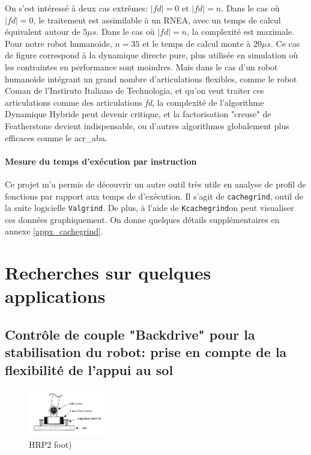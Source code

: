 \documentclass{report}
\begin{document}
On s'est intéressé à deux cas extrêmes: $|fd|=0$ et $|fd|=n$. Dans le cas où $|fd|=0$, le traitement est assimilable à un RNEA, avec un temps de calcul équivalent autour de $5\mu s$. Dans le cas où $|fd|=n$, la complexité est maximale. Pour notre robot humanoïde, $n=35$ et le temps de calcul monte à $20\mu s$. Ce cas de figure correspond à la dynamique directe pure, plus utilisée en simulation où les contraintes en performance sont moindres. Mais dans le cas d'un robot humanoïde intégrant un grand nombre d'articulations flexibles, comme le robot Coman de l'Instiruto Italiano de Technologia, et qu'on veut traiter ces articulations comme des articulations \emph{fd}, la complexité de l'algorithme Dynamique Hybride peut devenir critique, et la factorisation "creuse" de Featherstone devient indispensable, ou d'autres algorithmes globalement plus efficaces comme le \gls{acr_aba}.


\paragraph{Mesure du temps d'exécution par instruction}
Ce projet m'a permis de découvrir un autre outil très utile en analyse de profil de fonctions par rapport aux temps de d'exécution. Il s'agit de \verb;cachegrind;, outil de la suite logicielle \verb;Valgrind;. De plus, à l'aide de \verb;Kcachegrind;on peut visualiser ces données graphiquement. On donne quelques détails supplémentaires en annexe \ref{appx_cachegrind}.


\section{Recherches sur quelques applications}

\subsection{Contrôle de couple "Backdrive" pour la stabilisation du robot: prise en compte de la flexibilité de l'appui au sol}

\begin{figure}
  \centering
  \includegraphics[width=0.3\textwidth]{figs/HRP2foot.png}
  \caption{HRP2 foot)}
  \label{fig_hrp2Foot}
\end{figure}
\end{document}

